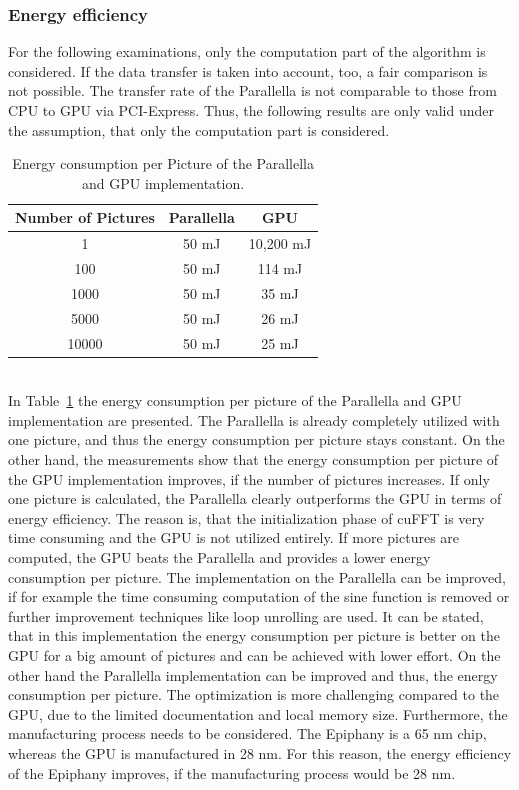 \documentclass[american, hauptseminar, twoside]{zihpub}
\begin{document}
				\subsubsection*{Energy efficiency}
					For the following examinations, only the computation part of the algorithm is considered. If the data transfer is taken into account, too, a fair comparison is not possible. The transfer rate of the Parallella is not comparable to those from CPU to GPU via PCI-Express. Thus, the following results are only valid under the assumption, that only the computation part is considered.
					\begin{table}[]
						\centering
						\renewcommand{\arraystretch}{1.2}
						\begin{tabular}{|c|c|c|}
							\hline
							Number of Pictures & Parallella & GPU \\
							\hline\hline
							1 & 50 mJ & 10,200 mJ \\
							\hline
							100  & 50 mJ & 114 mJ \\
							\hline 
							1000 & 50 mJ & 35 mJ \\
							\hline
							5000 & 50 mJ & 26 mJ \\
							\hline
							10000 & 50 mJ & 25 mJ \\
							\hline
						\end{tabular}
						\caption{Energy consumption per Picture of the Parallella and GPU implementation.}
						\label{tab:energy}
					\end{table}
					\\
					In Table~\ref{tab:energy} the energy consumption per picture of the Parallella and GPU implementation are presented. The Parallella is already completely utilized with one picture, and thus the energy consumption per picture stays constant. On the other hand, the measurements show that the energy consumption per picture of the GPU implementation improves, if the number of pictures increases. If only one picture is calculated, the Parallella clearly outperforms the GPU in terms of energy efficiency. The reason is, that the initialization phase of cuFFT is very time consuming and the GPU is not utilized entirely. If more pictures are computed, the GPU beats the Parallella and provides a lower energy consumption per picture. The implementation on the Parallella can be improved, if for example the time consuming computation of the sine function is removed or further improvement techniques like loop unrolling are used. It can be stated, that in this implementation the energy consumption per picture is better on the GPU for a big amount of pictures and can be achieved with lower effort. On the other hand the Parallella implementation can be improved and thus, the energy consumption per picture. The optimization is more challenging compared to the GPU, due to the limited documentation and local memory size. Furthermore, the manufacturing process needs to be considered. The Epiphany is a 65 nm chip, whereas the GPU is manufactured in 28 nm. For this reason, the energy efficiency of the Epiphany improves, if the manufacturing process would be 28 nm. 
					
\end{document}
